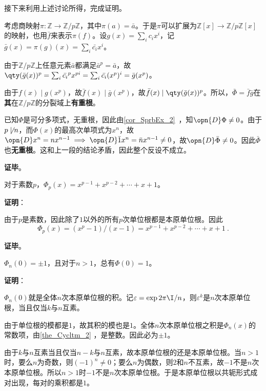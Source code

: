接下来利用上述讨论所得，完成证明。

考虑商映射$\pi:\mathbb{Z}\to\mathbb{Z}/p\mathbb{Z}$，其中$\pi(a)=\bar{a}$。于是$\pi$可以扩展为$\mathbb{Z}[x]\to\mathbb{Z}/p\mathbb{Z}[x]$的映射，也用$\bar{f}$来表示$\pi(f)$。设$g(x)=\sum_i c_ix^i$，记$\bar{g}(x)=\pi(g)(x)=\sum_i \bar{c_i}x^i$。

由于$\mathbb{Z}/p\mathbb{Z}$上任意元素$\bar{a}$都满足$\bar{a}^p=\bar{a}$，故$\qty(\bar{g}(x))^p=\sum_i\bar{c_i}^px^{pi}=\sum_i \bar{c_i}(x^p)^i=\bar{g}(x^p)$。

由于$f(x)\mid g(x^p)$，故$\bar{f}(x)\mid \bar{g}(x^p)$，故$\bar{f}(x)\mid \qty(\bar{g}(x))^p$。所以，$\bar{\Phi}=\bar{f}\bar{g}$在\textbf{其}在$\mathbb{Z}/p\mathbb{Z}$的分裂域上\textbf{有重根}。

已知$\Phi$是可分多项式，无重根，因此由\autoref{cor_SprbEx_2}~，知$\opn{D}\Phi\neq 0$。由于$p\not\mid n$，而$\Phi(x)$的最高次单项式为$x^n$，故$\opn{D}x^n=nx^{n-1}\implies \opn{D} \bar{1}x^n=\bar{n}x^{n-1}\neq 0$，故$\opn{D}\bar{\Phi}\neq 0$。因此$\bar{\Phi}$也\textbf{无重根}。这和上一段的结论矛盾，因此整个反设不成立。

\textbf{证毕}。



\begin{theorem}{}
对于素数$p$，$\Phi_p(x)=x^{p-1}+x^{p-2}+\cdots+x+1$。
\end{theorem}

\textbf{证明}：

由于$p$是素数，因此除了$1$以外的所有$p$次单位根都是本原单位根。因此
\begin{equation}
\Phi_p(x) = (x^p-1)/(x-1) = x^{p-1}+x^{p-2}+\cdots+x+1~.
\end{equation}

\textbf{证毕}。






\begin{theorem}{}
$\Phi_n(0)=\pm 1$，且对于$n>1$，总有$\Phi(0)=1$。
\end{theorem}

\textbf{证明}：

$\Phi_n(0)$就是全体$n$次本原单位根的积。记$\varepsilon=\exp{2\pi\I/n}$，则$\varepsilon^k$是$n$次本原单位根，当且仅当$k$与$n$互素。

由于单位根的模都是$1$，故其积的模也是$1$。全体$n$次本原单位根之积是$\Phi_n(x)$的常数项，由\autoref{the_Cycltm_2} ，是整数。因此必为$\pm 1$。

由于$k$与$n$互素当且仅当$n-k$与$n$互素，故本原单位根的还是本原单位根。当$n>1$时，要么$n$为奇数，则$(-1)^n\neq 0$；要么$n$为偶数，则$2$和$n$不互素，故$-1$不是$n$次本原单位根。所以$n>1$时$-1$不是$n$次本原单位根。于是本原单位根以共轭形式成对出现，每对的乘积都是$1$。

